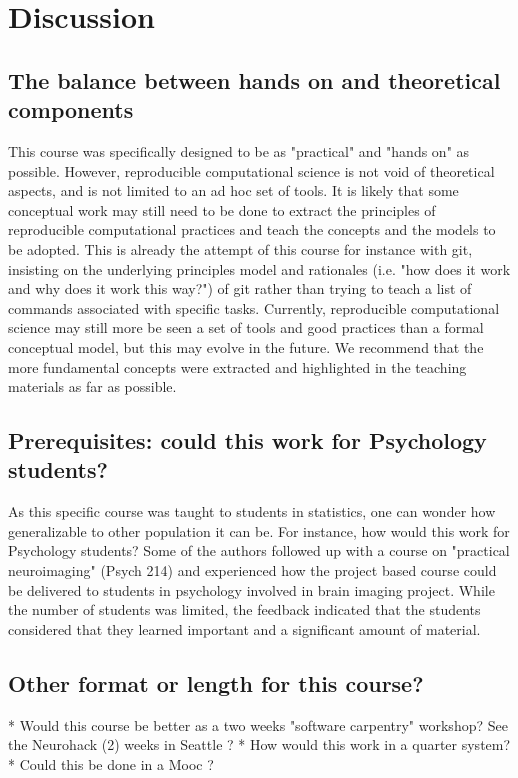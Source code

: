 \section{Discussion}\label{discussion}

\subsection*{The balance between hands on and theoretical components}
This course was specifically designed to be as "practical" and "hands on" as
possible. However, reproducible computational science is not void of
theoretical aspects, and is not limited to an ad hoc set of tools. It is likely
that some conceptual work may still need to be done to extract the principles
of reproducible computational practices and teach the concepts and the models
to be adopted. This is already the attempt of this course for instance with
git, insisting on the underlying principles model and rationales (i.e. "how
does it work and why does it work this way?") of git rather than trying to
teach a list of commands associated with specific tasks. Currently,
reproducible computational science may still more be seen a set of tools and
good practices than a formal conceptual model, but this may evolve in the
future. We recommend that the more fundamental concepts were extracted and
highlighted in the teaching materials as far as possible. 

\subsection*{Prerequisites: could this work for Psychology students?}
As this specific course was taught to students in statistics, one can wonder
how generalizable to other population it can be. For instance, how would this
work for Psychology students? Some of the authors followed up with a course on
"practical neuroimaging" (Psych 214) and experienced how the project based
course could be delivered to students in psychology involved in brain imaging
project. While the number of students was limited, the feedback indicated that
the students considered that they learned important and a significant amount
of material.

\subsection*{Other format or length for this course?}
* Would this course be better as a two weeks "software carpentry" workshop? See the Neurohack (2) weeks in Seattle ?
* How would this work in a quarter system?
* Could this be done in a Mooc ? 

